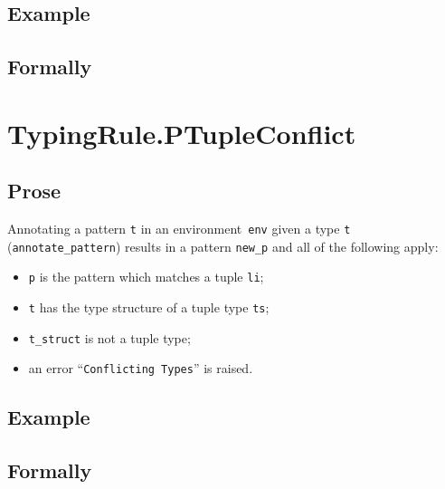 \documentclass{book}
\begin{document}
\begin{itemize}
  \subsection{Example}



\begin{emptyformal}
    \subsection{Formally}
\end{emptyformal}



\section{TypingRule.PTupleConflict \label{sec:TypingRule.PTupleConflict}}

  \subsection{Prose}
   Annotating a pattern \texttt{t} in an environment~\texttt{env} given a type \texttt{t} (\texttt{annotate\_pattern}) results in a pattern \texttt{new\_p} and all of the following apply:
   \begin{itemize}
   \item \texttt{p} is the pattern which matches a tuple \texttt{li};
   \item \texttt{t} has the type structure of a tuple type \texttt{ts};
   \item \texttt{t\_struct} is not a tuple type;
   \item an error ``\texttt{Conflicting Types}'' is raised.
   \end{itemize}

  \subsection{Example}



\begin{emptyformal}
    \subsection{Formally}
\end{emptyformal}


\end{itemize}
\end{document}
